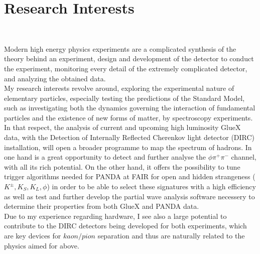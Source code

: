 \documentclass[a4paper,roman]{article}
\begin{document}
\section*{Research Interests}
~\par Modern high energy physics experiments are a complicated synthesis of the theory behind an experiment, design and development of the detector to conduct the experiment, monitoring every detail of the extremely complicated detector, and analyzing the obtained data.\\
My research interests revolve around, exploring the experimental nature of elementary particles, especially testing the predictions of the Standard Model, such as investigating both the dynamics governing the interaction of fundamental particles and the existence of new forms of matter, by spectroscopy experiments.\\
In that respect, the analysis of current and upcoming high luminosity GlueX data, with the Detection of Internally Reflected Cherenkov light detector (DIRC) installation, will open a broader programme to map the spectrum of hadrons. In one hand is a great opportunity to detect and further analyse the $\phi\pi^{+}\pi^{-}$ channel, with all its rich potential. On the other hand, it offers the possibility to tune trigger algorithms needed for PANDA at FAIR for open and hidden strangeness ($K^{\pm}, K_S, K_L, \phi$) in order to be able to select these signatures with a high efficiency as well as test and further develop the partial wave analysis software necessery to determine their properties from both GlueX and PANDA data.\\
Due to my experience regarding hardware, I see also a large potential to contribute to the DIRC detectors being developed for both experiments, which are key devices for $kaon/pion$ separation and thus are naturally related to the physics aimed for above.
\end{document}
